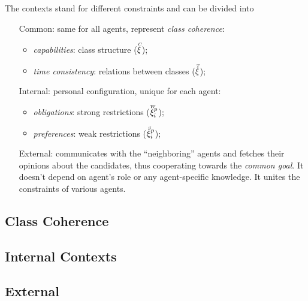 \documentclass[../ThesisDoc]{subfiles}
\begin{document}

\noindent
The contexts stand for different constraints and can be divided into
\begin{itemize}[leftmargin=2cm]
  \item[Common:] same for all agents, represent \emph{class coherence}:
    \begin{itemize}
      \item \emph{capabilities}: class structure ($\accentset{C}{\xi}$);
      \item \emph{time consistency}: relations between classes ($\accentset{T}{\xi}$);
    \end{itemize}
  \item[Internal:] personal configuration, unique for each agent:
    \begin{itemize}
      \item \emph{obligations}: strong restrictions ($\accentset{W}{\xi}^p_i$);
      \item \emph{preferences}: weak restrictions ($\accentset{S}{\xi}^p_i$);
    \end{itemize}
  \item[External:] communicates with the ``neighboring'' agents and fetches
    their opinions about the candidates, thus cooperating towards the
    \emph{common goal}. It doesn't depend on agent's role or
      any agent-specific knowledge. It unites the constraints of various agents.
\end{itemize}


\subsection{Class Coherence}

\subsection{Internal Contexts}

\subsection{External}

\end{document}
